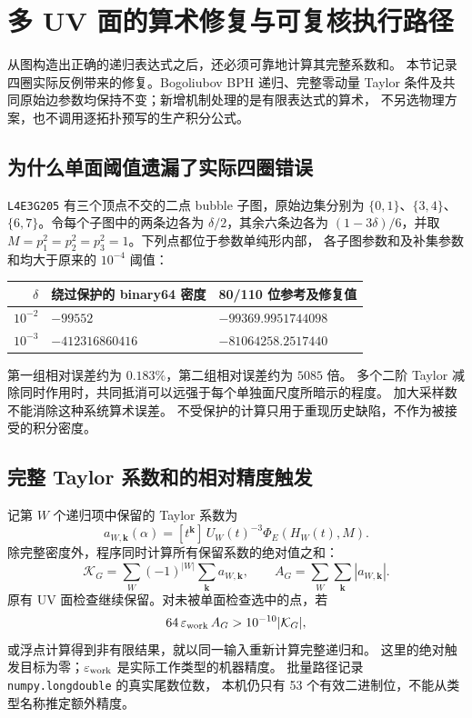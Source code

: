 \section{多 UV 面的算术修复与可复核执行路径}
\label{sec:precision-repair}

从图构造出正确的递归表达式之后，还必须可靠地计算其完整系数和。
本节记录四圈实际反例带来的修复。Bogoliubov BPH 递归、完整零动量
Taylor 条件及共同原始边参数均保持不变；新增机制处理的是有限表达式的算术，
不另选物理方案，也不调用逐拓扑预写的生产积分公式。

\subsection{为什么单面阈值遗漏了实际四圈错误}

\texttt{L4E3G205} 有三个顶点不交的二点 bubble 子图，原始边集分别为
$\{0,1\}$、$\{3,4\}$、$\{6,7\}$。令每个子图中的两条边各为
$\delta/2$，其余六条边各为 $(1-3\delta)/6$，并取
$M=p_1^2=p_2^2=p_3^2=1$。下列点都位于参数单纯形内部，
各子图参数和及补集参数和均大于原来的 $10^{-4}$ 阈值：
\begin{center}\small
\begin{tabular}{rll}\toprule
$\delta$ & 绕过保护的 binary64 密度 & 80/110 位参考及修复值\\\midrule
$10^{-2}$ & $-99552$ & $-99369.9951744098$\\
$10^{-3}$ & $-412316860416$ & $-81064258.2517440$\\\bottomrule
\end{tabular}
\end{center}
第一组相对误差约为 $0.183\%$，第二组相对误差约为 $5085$ 倍。
多个二阶 Taylor 减除同时作用时，共同抵消可以远强于每个单独面尺度所暗示的程度。
加大采样数不能消除这种系统算术误差。
不受保护的计算只用于重现历史缺陷，不作为被接受的积分密度。

\subsection{完整 Taylor 系数和的相对精度触发}

记第 $W$ 个递归项中保留的 Taylor 系数为
\[
 a_{W,\mathbf k}(\alpha)
 =[t^{\mathbf k}]\,U_W(t)^{-3}\Phi_E(H_W(t),M).
\]
除完整密度外，程序同时计算所有保留系数的绝对值之和：
\[
 \mathcal K_G=\sum_W(-1)^{|W|}\sum_{\mathbf k}a_{W,\mathbf k},
 \qquad
 A_G=\sum_W\sum_{\mathbf k}|a_{W,\mathbf k}|.
\]
原有 UV 面检查继续保留。对未被单面检查选中的点，若
\begin{equation}
 64\,\varepsilon_{\rm work}\,A_G
 >10^{-10}|\mathcal K_G|,
 \label{eq:relative-cancellation-trigger}
\end{equation}
或浮点计算得到非有限结果，就以同一输入重新计算完整递归和。
这里的绝对触发目标为零；$\varepsilon_{\rm work}$ 是实际工作类型的机器精度。
批量路径记录 \texttt{numpy.longdouble} 的真实尾数位数，
本机仍只有 53 个有效二进制位，不能从类型名称推定额外精度。

